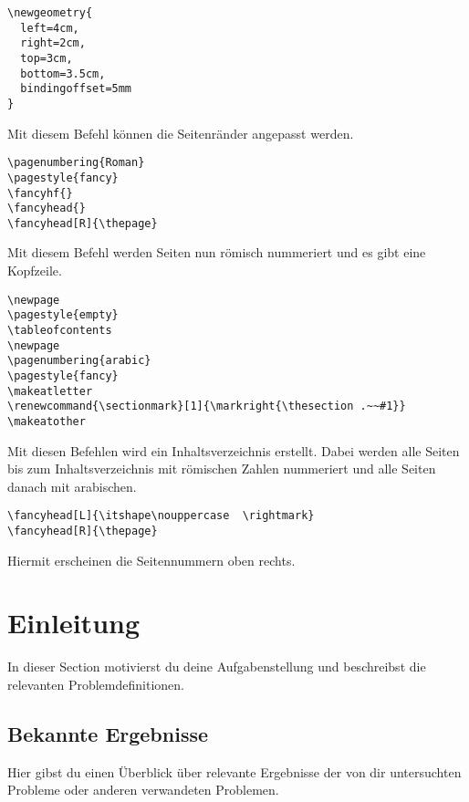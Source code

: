 \documentclass[12pt,a4paper]{article}
\begin{document}
\begin{verbatim}
\newgeometry{
  left=4cm,
  right=2cm,
  top=3cm,
  bottom=3.5cm,
  bindingoffset=5mm
}
\end{verbatim}
Mit diesem Befehl können die Seitenränder angepasst werden.


\pagestyle{fancy}
\fancyhf{}
\fancyhead{} 
\fancyhead[R]{\thepage}

\begin{verbatim}
\pagenumbering{Roman}
\pagestyle{fancy}
\fancyhf{}
\fancyhead{} 
\fancyhead[R]{\thepage}
\end{verbatim}
Mit diesem Befehl werden Seiten nun römisch nummeriert und es gibt eine Kopfzeile.


\newpage
\pagestyle{empty}
\tableofcontents
\newpage
{}    
\pagestyle{fancy}
\makeatletter
\renewcommand{\sectionmark}[1]{\markright{\thesection .~~#1}}
\makeatother

\begin{verbatim}
\newpage
\pagestyle{empty}
\tableofcontents
\newpage
\pagenumbering{arabic}    
\pagestyle{fancy}
\makeatletter
\renewcommand{\sectionmark}[1]{\markright{\thesection .~~#1}}
\makeatother
\end{verbatim}

Mit diesen Befehlen wird ein Inhaltsverzeichnis erstellt. 
Dabei werden alle Seiten bis zum Inhaltsverzeichnis mit römischen Zahlen nummeriert und alle Seiten danach mit arabischen.



\fancyhead[L]{\itshape\nouppercase  \rightmark}
\fancyhead[R]{\thepage}
\begin{verbatim}
\fancyhead[L]{\itshape\nouppercase  \rightmark}
\fancyhead[R]{\thepage}
\end{verbatim}
Hiermit erscheinen die Seitennummern oben rechts.


\section{Einleitung}
In dieser Section motivierst du deine Aufgabenstellung und beschreibst die relevanten Problemdefinitionen.

\subsection{Bekannte Ergebnisse}
Hier gibst du einen Überblick über relevante Ergebnisse der von dir untersuchten Probleme oder anderen verwandeten Problemen.
\end{document}
